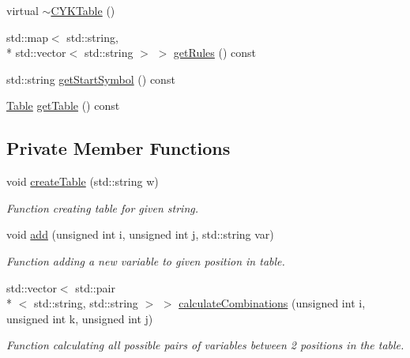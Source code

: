 \begin{DoxyCompactItemize}
virtual \hyperlink{classCYKTable_af136b6ce499fe3375cf58a9897f2a855}{$\sim$\-C\-Y\-K\-Table} ()
\item 
std\-::map$<$ std\-::string, \\*
std\-::vector$<$ std\-::string $>$ $>$ \hyperlink{classCYKTable_a4f57052001961a166453e5cd224d52e8}{get\-Rules} () const 
\item 
std\-::string \hyperlink{classCYKTable_af2065276b21835ad5ddbdb2d5ac9f90d}{get\-Start\-Symbol} () const 
\item 
\hyperlink{CYKTable_8h_a98fc1757708d007972f5f4640a85323e}{Table} \hyperlink{classCYKTable_a8de3508f979280f9b4c4a7b08f68f05a}{get\-Table} () const 
\end{DoxyCompactItemize}
\subsection*{Private Member Functions}
\begin{DoxyCompactItemize}
\item 
void \hyperlink{classCYKTable_a7aaee4d68e79f91fb6ff28b14f63668a}{create\-Table} (std\-::string w)
\begin{DoxyCompactList}\small\item\em Function creating table for given string. \end{DoxyCompactList}\item 
void \hyperlink{classCYKTable_a0cef9ae424db0d878c6d22808c1ce37a}{add} (unsigned int i, unsigned int j, std\-::string var)
\begin{DoxyCompactList}\small\item\em Function adding a new variable to given position in table. \end{DoxyCompactList}\item 
std\-::vector$<$ std\-::pair\\*
$<$ std\-::string, std\-::string $>$ $>$ \hyperlink{classCYKTable_a570a60f85560234161476aa53d526931}{calculate\-Combinations} (unsigned int i, unsigned int k, unsigned int j)
\begin{DoxyCompactList}\small\item\em Function calculating all possible pairs of variables between 2 positions in the table. \end{DoxyCompactList}\end{DoxyCompactItemize}
